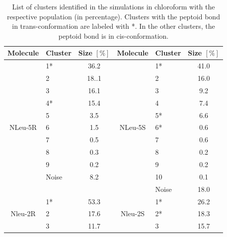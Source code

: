\begin{table}[h!]
\center
\caption{List of clusters identified in the simulations in chloroform with the  respective population (in percentage). Clusters with the peptoid bond in trans-conformation are labeled with *. In the other clusters, the peptoid bond is in cis-conformation.}
\label{tab:SIClusterTransCHCL3}
  \begin{adjustbox}{max width=\textwidth}
\begin{tabular}{c|lc||c|lc}
Molecule                  & Cluster & Size $[\%]$ & Molecule                  & Cluster & Size $[\%]$ \\
\hline
\multirow{11}{*}{NLeu-5R} & 1*      & 36.2        & \multirow{11}{*}{NLeu-5S} & 1*      & 41.0        \\
                          & 2       & 18..1       &                           & 2       & 16.0        \\
                          & 3       & 16.1        &                           & 3       & 9.2         \\
                          & 4*      & 15.4        &                           & 4       & 7.4         \\
                          & 5       & 3.5         &                           & 5*      & 6.6         \\
                          & 6       & 1.5         &                           & 6*      & 0.6         \\
                          & 7       & 0.5         &                           & 7       & 0.6         \\
                          & 8       & 0.3         &                           & 8       & 0.2         \\
                          & 9       & 0.2         &                           & 9       & 0.2         \\
                          & Noise   & 8.2         &                           & 10      & 0.1         \\
                          &         &             &                           & Noise   & 18.0        \\
\hline
\multirow{6}{*}{Nleu-2R}  & 1*      & 53.3        & \multirow{13}{*}{Nleu-2S} & 1*      & 26.2        \\
                          & 2       & 17.6        &                           & 2*      & 18.3        \\
                          & 3       & 11.7        &                           & 3       & 15.7        \\

\end{tabular}
\end{adjustbox}
\end{table}
